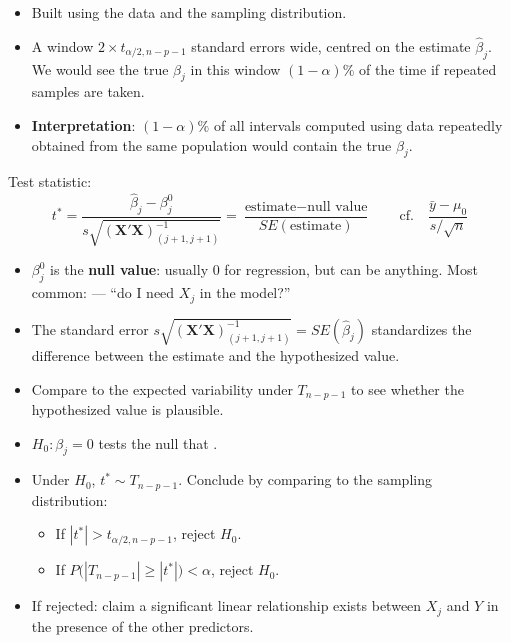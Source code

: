 \begin{itemize}
    \item Built using the data and the sampling distribution.
    \item A window $2\times t_{\alpha/2,n-p-1}$ standard errors wide, centred on the
    estimate $\hat\beta_j$. We would see the true $\beta_j$ in this window
    $(1-\alpha)\%$ of the time if repeated samples are taken.
    \item \textbf{Interpretation}: $(1-\alpha)\%$ of all intervals computed using data
    repeatedly obtained from the same population would contain the true $\beta_j$.
\end{itemize}

\begin{definition}[Hypothesis Test of $H_0:\beta_j=\beta_j^0$]
    Test statistic:
    \[\boxed{t^*=\frac{\hat\beta_j-\beta_j^0}{s\sqrt{(\mathbf{X}'\mathbf{X})^{-1}_{(j+1,j+1)}}}
    =\frac{\text{estimate}-\text{null value}}{SE(\text{estimate})}}
    \qquad\text{cf.}\quad\frac{\bar y-\mu_0}{s/\sqrt n}\]
    \begin{itemize}
        \item $\beta_j^0$ is the \textbf{null value}: usually 0 for regression, but can be anything.
        Most common:  --- ``do I need $X_j$ in the model?''
        \item The standard error $s\sqrt{(\mathbf{X}'\mathbf{X})^{-1}_{(j+1,j+1)}}=SE(\hat\beta_j)$
        standardizes the difference between the estimate and the hypothesized value.
        \item Compare to the expected variability under $T_{n-p-1}$ to see whether the
        hypothesized value is plausible.
    \end{itemize}
\end{definition}

\begin{itemize}
    \item $H_0:\beta_j=0$ tests the null that  .
    \item Under $H_0$, $t^*\sim T_{n-p-1}$. Conclude by comparing to the sampling distribution:
    \begin{itemize}
        \item If $|t^*|>t_{\alpha/2,n-p-1}$, reject $H_0$.
        \item If $P\big(|T_{n-p-1}|\geq|t^*|\big)<\alpha$, reject $H_0$.
    \end{itemize}
    \item If rejected: claim a significant linear relationship exists between $X_j$ and
    $Y$ in the presence of the other predictors.
\end{itemize}

